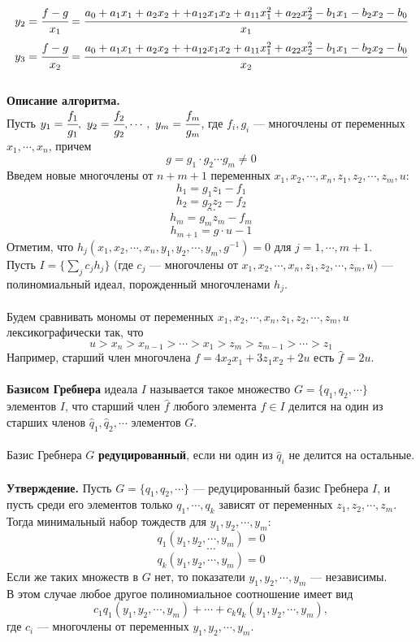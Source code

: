 \documentclass[12pt]{article}
\theoremstyle{definition}
\numberwithin{equation}{section}
\begin{document}
$$y_2=\cfrac{f-g}{x_1}=\cfrac{a_0+a_1x_1+a_2x_2++a_{12}x_1x_2+a_{11}x_1^2+a_{22}x_2^2-b_1x_1-b_2x_2-b_0}{x_1}$$
$$y_3=\cfrac{f-g}{x_2}=\cfrac{a_0+a_1x_1+a_2x_2++a_{12}x_1x_2+a_{11}x_1^2+a_{22}x_2^2-b_1x_1-b_2x_2-b_0}{x_2}$$
\\
\textbf{Описание алгоритма.}\\
Пусть $y_1=\cfrac{f_1}{g_1},~y_2=\cfrac{f_2}{g_2},\cdots,~y_m=\cfrac{f_m}{g_m}$, где $f_i, g_i$ --- многочлены от переменных $x_1, \cdots, x_n$, причем $$g=g_1\cdot g_2 \cdots g_m \neq 0$$
Введем новые многочлены от $n+m+1$ переменных $x_1, x_2, \cdots, x_n, z_1, z_2, \cdots, z_m, u$: $$h_1=g_1z_1-f_1$$
$$h_2=g_2z_2-f_2$$
$$\cdots$$
$$h_m=g_mz_m-f_m$$
$$h_{m+1}=g\cdot u-1$$
Отметим, что $h_j(x_1, x_2, \cdots, x_n, y_1, y_2, \cdots, y_m, g^{-1})=0$ для $j=1, \cdots, m+1$.\\
Пусть $I=\{\sum \limits_j c_j h_j\}$ (где $c_j$ --- многочлены от $x_1, x_2, \cdots, x_n, z_1, z_2, \cdots, z_m, u$) --- полиномиальный идеал, порожденный многочленами $h_j$.\\
\\
Будем сравнивать мономы от переменных $x_1, x_2, \cdots, x_n, z_1, z_2, \cdots, z_m, u$ лексикографически так, что $$u>x_n>x_{n-1}>\cdots >x_1>z_m>z_{m-1}>\cdots >z_1$$
Например, старший член многочлена $f=4x_2x_1+3z_1x_2+2u$ есть $\hat f=2u$.\\
\\
\textbf{Базисом Гребнера} идеала $I$ называется такое множество $G=\{q_1, q_2, \cdots\}$ элементов $I$, что старший член $\hat f$ любого элемента $f\in I$ делится на один из старших членов $\hat q_1, \hat q_2,\cdots$ элементов $G$.\\
\\
Базис Гребнера $G$ \textbf{редуцированный}, если ни один из $\hat q_i$ не делится на остальные.\\
\\
\textbf{Утверждение.} Пусть $G=\{q_1, q_2, \cdots\}$ --- редуцированный базис Гребнера $I$, и пусть среди его элементов только $q_1, \cdots, q_k$ зависят от переменных $z_1, z_2, \cdots, z_m$. Тогда минимальный набор тождеств для $y_1, y_2, \cdots, y_m$:
$$q_1(y_1, y_2, \cdots, y_m)=0$$
$$\cdots$$
$$q_k(y_1, y_2, \cdots, y_m)=0$$
Если же таких множеств в $G$ нет, то показатели $y_1, y_2, \cdots, y_m$ --- независимы.\\
В этом случае любое другое полиномиальное соотношение имеет вид 
$$c_1q_1(y_1, y_2, \cdots, y_m)+\cdots+c_kq_k(y_1, y_2, \cdots, y_m),$$
где $c_i$ --- многочлены от переменных $y_1, y_2, \cdots, y_m$.\\
\end{document}

